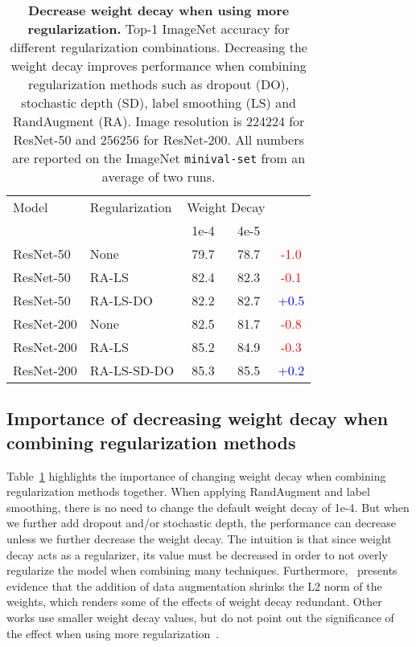 \documentclass{article}
\begin{document}
\begin{table}[ht!]
\begin{center}
\small
\begin{tabular}{l|l|cc|c}
  \toprule
  Model & Regularization & \multicolumn{2}{c|}{Weight Decay} &  \\
  & & \footnotesize{1e-4} & \footnotesize{4e-5} & \\
  \midrule
  ResNet-50 & None & 79.7 & 78.7 & \textcolor{red}{-1.0} \\
  ResNet-50 & RA-LS & 82.4 & 82.3 & \textcolor{red}{-0.1} \\
  ResNet-50 & RA-LS-DO & 82.2 & 82.7 & \textcolor{blue}{+0.5} \\
  \midrule
  ResNet-200 & None & 82.5 & 81.7 & \textcolor{red}{-0.8} \\
  ResNet-200 & RA-LS & 85.2 & 84.9 & \textcolor{red}{-0.3} \\
  ResNet-200 & RA-LS-SD-DO & 85.3 & 85.5 & \textcolor{blue}{+0.2} \\
  \bottomrule
\end{tabular}
\end{center}
\vspace{-0.15cm}
\caption{\textbf{Decrease weight decay when using more regularization.} Top-1 ImageNet accuracy for different regularization combinations. Decreasing the weight decay improves performance when combining regularization methods such as dropout (DO), stochastic depth (SD), label smoothing (LS) and RandAugment (RA). Image resolution is 224224 for ResNet-50 and 256256 for ResNet-200. All numbers are reported on the ImageNet \texttt{minival-set} from an average of two runs.}
\label{tab:wd_analysis} 
\vspace{-0.15cm}
\end{table}

\subsection{Importance of decreasing weight decay when combining regularization methods}
Table~\ref{tab:wd_analysis} highlights the importance of changing weight decay when combining regularization methods together. 
When applying RandAugment and label smoothing, there is no need to change the default weight decay of 1e-4. 
But when we further add dropout and/or stochastic depth, the performance can decrease unless we further decrease the weight decay. 
The intuition is that since weight decay acts as a regularizer, its value must be decreased in order to not overly regularize the model when combining many techniques. 
Furthermore,~\citet{zoph2020learning} presents evidence that the addition of data augmentation shrinks the L2 norm of the weights, which renders some of the effects of weight decay redundant.
Other works use smaller weight decay values, but do not point out the significance of the effect when using more regularization~\cite{tan2019mnasnet,tan2019efficientnet}.
\end{document}
